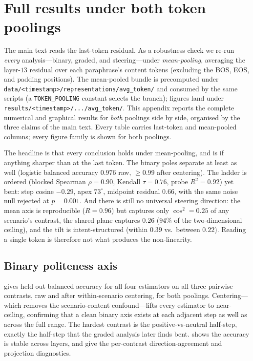 \documentclass{article}
\begin{document}
\section{Full results under both token poolings}\label{app:pooling}

The main text reads the last-token residual. As a robustness check we re-run
\emph{every} analysis---binary, graded, and steering---under \emph{mean-pooling},
averaging the layer-$13$ residual over each paraphrase's content tokens
(excluding the BOS, EOS, and padding positions). The mean-pooled bundle is
precomputed under \texttt{data/<timestamp>/representations/avg\_token/} and
consumed by the same scripts (a \texttt{TOKEN\_POOLING} constant selects the
branch); figures land under \texttt{results/<timestamp>/.../avg\_token/}. This
appendix reports the complete numerical and graphical results for \emph{both}
poolings side by side, organised by the three claims of the main text. Every
table carries last-token and mean-pooled columns; every figure family is shown
for both poolings.

The headline is that every conclusion holds under mean-pooling, and is if
anything sharper than at the last token. The binary poles separate at least as
well (logistic balanced accuracy $0.976$ raw, $\geq0.99$ after centering). The
ladder is ordered (blocked Spearman $\rho=0.90$, Kendall $\tau=0.76$, probe
$R^2=0.92$) yet bent: step cosine $-0.29$, apex $73^\circ$, midpoint residual
$0.66$, with the same noise null rejected at $p=0.001$. And there is still no
universal steering direction: the mean axis is reproducible ($R=0.96$) but
captures only $\cos^2=0.25$ of any scenario's contrast, the shared plane captures
$0.26$ ($94\%$ of the two-dimensional ceiling), and the tilt is intent-structured
(within $0.39$ vs.\ between $0.22$). Reading a single token is therefore not what
produces the non-linearity.

\subsection{Binary politeness axis}\label{app:res-binary}

 gives held-out balanced accuracy for all four estimators on all
three pairwise contrasts, raw and after within-scenario centering, for both
poolings. Centering---which removes the scenario-content confound---lifts every
estimator to near-ceiling, confirming that a clean binary axis exists at each
adjacent step as well as across the full range. The hardest contrast is the
positive-vs-neutral half-step, exactly the half-step that the graded analysis
later finds bent.  shows the accuracy is stable across layers,
and  give
the per-contrast direction-agreement and projection diagnostics.
\end{document}
